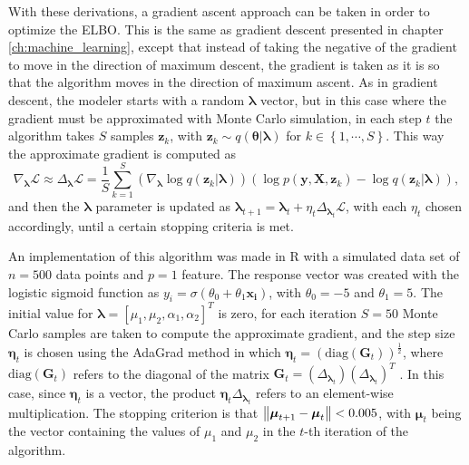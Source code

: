 With these derivations, a gradient ascent approach can be taken in order to optimize the ELBO. This is the same as gradient descent presented in chapter \ref{ch:machine_learning}, except that instead of taking the negative of the gradient to move in the direction of maximum descent, the gradient is taken as it is so that the algorithm moves in the direction of maximum ascent. As in gradient descent, the modeler starts with a random $\boldsymbol{\lambda}$ vector, but in this case where the gradient must be approximated with Monte Carlo simulation, in each step $t$ the algorithm takes $S$ samples $\boldsymbol{z}_k$, with $\boldsymbol{z}_k \sim q(\boldsymbol{\theta} | \boldsymbol{\lambda})$ for $k \in \left\{1, \cdots, S \right\}$. This way the approximate gradient is computed as
\begin{equation}
  \nabla_{\boldsymbol{\lambda}} \mathcal{L} \approx \Delta_{\boldsymbol{\lambda}} \mathcal{L} = \frac{1}{S} \sum_{k = 1}^S \left( \nabla_{\boldsymbol{\lambda}} \log q(\boldsymbol{z}_k | \boldsymbol{\lambda}) \right) \left( \log p(\boldsymbol{y}, \boldsymbol{X}, \boldsymbol{z}_k) - \log q(\boldsymbol{z}_k | \boldsymbol{\lambda}) \right),
\end{equation}
and then the $\boldsymbol{\lambda}$ parameter is updated as $\boldsymbol{\lambda}_{t+1} = \boldsymbol{\lambda}_{t} + \eta_t  \Delta_{\boldsymbol{\lambda}_t} \mathcal{L}$, with each $\eta_t$ chosen accordingly, until a certain stopping criteria is met.

An implementation of this algorithm was made in R with a simulated data set of $n = 500$ data points and $p = 1$ feature. The response vector was created with the logistic sigmoid function as $y_i = \sigma(\theta_0 + \theta_1 \boldsymbol{x_i})$, with $\theta_0 = -5$ and $\theta_1 = 5$. The initial value for $\boldsymbol{\lambda} = \left[ \mu_1, \mu_2, \alpha_1, \alpha_2 \right]^T$ is zero, for each iteration $S = 50$ Monte Carlo samples are taken to compute the approximate gradient, and the step size $\boldsymbol{\eta}_t$ is chosen using the AdaGrad method in which
$\boldsymbol{\eta}_t = \left( \mathrm{diag}(\boldsymbol{G}_t) \right)^{\frac{1}{2}}$, where $\mathrm{diag}(\boldsymbol{G}_t)$ refers to the diagonal of the matrix $\boldsymbol{G}_t = \left( \Delta_{\boldsymbol{\lambda}_t} \right) \left( \Delta_{\boldsymbol{\lambda}_t} \right)^T$ \cite{duchi2011adaptive}. In this case, since $\boldsymbol{\eta}_t$ is a vector, the product $\boldsymbol{\eta}_t \Delta_{\boldsymbol{\lambda}_t}$ refers to an element-wise multiplication. The stopping criterion is that
$\left\lVert \boldsymbol{\mu}_{t+1} - \boldsymbol{\mu}_{t} \right\rVert < 0.005$,
with $\boldsymbol{\mu}_t$ being the vector containing the values of $\mu_1$ and $\mu_2$ in the $t$-th iteration of the algorithm.

